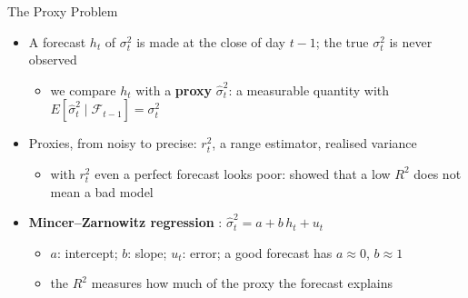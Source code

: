 \begin{frame}{The Proxy Problem}
\itemsize{\small}
\begin{itemize}
    \item A forecast $h_t$ of $\sigma_t^2$ is made at the close of day $t-1$; the true $\sigma_t^2$ is never observed
    \begin{itemize}
        \item we compare $h_t$ with a \textbf{proxy} $\hat\sigma_t^2$: a measurable quantity with $E[\hat\sigma_t^2 \mid \mathcal{F}_{t-1}] = \sigma_t^2$
    \end{itemize}
    \item Proxies, from noisy to precise: $r_t^2$, a range estimator, realised variance
    \begin{itemize}
        \item with $r_t^2$ even a perfect forecast looks poor:  showed that a low $R^2$ does not mean a bad model
    \end{itemize}
    \item \textbf{Mincer--Zarnowitz regression} : $\hat\sigma_t^2 = a + b\,h_t + u_t$
    \begin{itemize}
        \item $a$: intercept; $b$: slope; $u_t$: error; a good forecast has $a \approx 0$, $b \approx 1$
        \item the $R^2$ measures how much of the proxy the forecast explains
    \end{itemize}
\end{itemize}
\end{frame}

